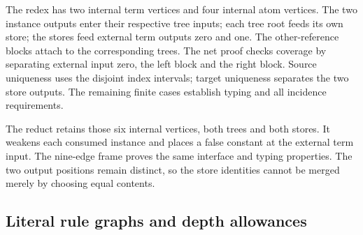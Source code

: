 


The redex has two internal term vertices and four internal atom vertices.
The two instance outputs enter their respective tree inputs; each tree
root feeds its own store; the stores feed external term outputs zero and
one. The other-reference blocks attach to the corresponding trees. The
net proof checks coverage by separating external input zero, the left
block and the right block. Source uniqueness uses the disjoint index
intervals; target uniqueness separates the two store outputs. The remaining
finite cases establish typing and all incidence requirements.





The reduct retains those six internal vertices, both trees and both
stores. It weakens each consumed instance and places a false constant at
the external term input. The nine-edge frame proves the same interface
and typing properties. The two output positions remain distinct, so the
store identities cannot be merged merely by choosing equal contents.





\subsection{Literal rule graphs and depth allowances}

